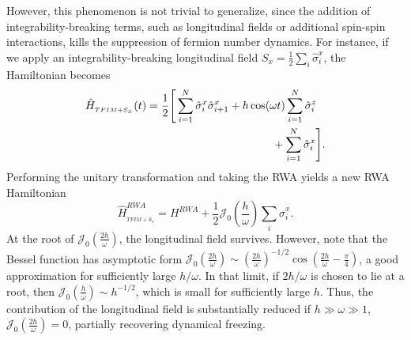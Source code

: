 \documentclass[%
reprint,
superscriptaddress,
amsmath,amssymb,
aps,
prb,
showkeys,
]{revtex4-2}
\begin{document}
However, this phenomenon is not trivial to generalize, since the addition of integrability-breaking terms, such as longitudinal fields or additional spin-spin interactions, kills the suppression of fermion number dynamics.  For instance, if we apply an integrability-breaking longitudinal field $S_x = \frac12 \sum_i \hat{\sigma}^x_i$, the Hamiltonian becomes 
\begin{align}
	\hat{H}_{_{TFIM+S_{x}}}(t) &=\frac12 \Bigg[\sum^N_{i=1}  \hat{\sigma}_{i}^{x} \hat{\sigma}_{i+1}^{x}+h \cos (\omega t) \sum^N_{i=1} \hat{\sigma}_{i}^{z}\nonumber\\
	&\hskip4cm  +\sum^N_{i=1} \hat{\sigma}_{i}^{x}\Bigg].
	\label{eq:tfim_sx}
\end{align}	
Performing the unitary transformation and taking the RWA yields a new RWA Hamiltonian
\begin{equation}
	\hat{H}_{_{TFIM+S_{x}}}^{R W A}= H^{RWA}+\frac12 \mathcal{J}_{0}\left(\frac{h}{\omega}\right) \sum_i\hat{\sigma}^x_i.
	\label{eq:tfim_sx1}
\end{equation}
At the root of $\mathcal{J}_0\left(\frac{2h}{\omega}\right)$, the longitudinal field survives. However, note that the Bessel function has asymptotic form $\mathcal{J}_0\left(\frac{2h}{\omega}\right)\sim \left(\frac{2h}{\omega}\right)^{-1/2}\cos\left(\frac{2h}{\omega}-\frac{\pi}{4}\right)$, a good approximation for sufficiently  large $h/\omega$. In that limit, if $2h/\omega$ is chosen to lie at a root, then $\mathcal{J}_0\left(\frac{h}{\omega}\right) \sim h^{-1/2}$, which is small for sufficiently large $h$. Thus, the contribution of the longitudinal field is substantially reduced if $h\gg\omega\gg1$, $\mathcal{J}_0\left(\frac{2h}{\omega}\right)=0$, partially recovering dynamical freezing.
\end{document}
